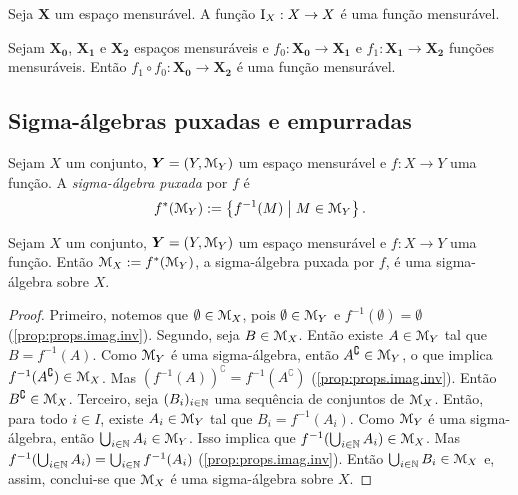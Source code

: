 \begin{proposition}
Seja $\bm X$ um espaço mensurável. A função $\mathrm{I}_X: X \to X$ é uma função mensurável.
\end{proposition}

\begin{proposition}
Sejam $\bm{X_0}$, $\bm{X_1}$ e $\bm{X_2}$ espaços mensuráveis e $f_0: \bm{X_0} \to \bm{X_1}$ e $f_1: \bm{X_1} \to \bm{X_2}$ funções mensuráveis. Então $f_1 \circ f_0: \bm{X_0} \to \bm{X_2}$ é uma função mensurável.
\end{proposition}

\subsection{Sigma-álgebras puxadas e empurradas}

\begin{definition}
Sejam $X$ um conjunto, $\bm Y = (Y,\mathcal{M}_Y)$ um espaço mensurável e $f: X \to Y$ uma função. A \emph{sigma-álgebra puxada} por $f$ é
	\begin{equation*}
	f^*(\mathcal{M}_Y) := \left\{{f^{-1}(M)}\;\middle\vert\;{M \in \mathcal{M}_Y}\right\}.
	\end{equation*}
\end{definition}

\begin{proposition}
Sejam $X$ um conjunto, $\bm Y = (Y,\mathcal{M}_Y)$ um espaço mensurável e $f: X \to Y$ uma função. Então $\mathcal{M}_X := f^*(\mathcal{M}_Y)$, a sigma-álgebra puxada por $f$, é uma sigma-álgebra sobre $X$.
\end{proposition}
\begin{proof}
Primeiro, notemos que $\emptyset \in \mathcal{M}_X$, pois $\emptyset \in \mathcal{M}_Y$ e $f^{-1}(\emptyset) = \emptyset$ (\ref{prop:props.imag.inv}). Segundo, seja $B \in \mathcal{M}_X$. Então existe $A \in \mathcal{M}_Y$ tal que $B = f^{-1}(A)$. Como $\mathcal{M}_Y$ é uma sigma-álgebra, então $A^\complement \in \mathcal{M}_Y$, o que implica $f^{-1}(A^\complement) \in \mathcal{M}_X$. Mas $(f^{-1}(A))^\complement = f^{-1}(A^\complement)$ (\ref{prop:props.imag.inv}). Então $B^\complement \in \mathcal{M}_X$. Terceiro, seja $(B_i)_{i \in \mathbb{N}}$ uma sequência de conjuntos de $\mathcal{M}_X$. Então, para todo $i \in I$, existe $A_i \in \mathcal{M}_Y$ tal que $B_i = f^{-1}(A_i)$. Como $\mathcal{M}_Y$ é uma sigma-álgebra, então $\bigcup_{i \in \mathbb{N}} A_i \in \mathcal{M}_Y$. Isso implica que $f^{-1}(\bigcup_{i \in \mathbb{N}} A_i) \in \mathcal{M}_X$. Mas $f^{-1}(\bigcup_{i \in \mathbb{N}} A_i) = \bigcup_{i \in \mathbb{N}} f^{-1}(A_i)$ (\ref{prop:props.imag.inv}). Então $\bigcup_{i \in \mathbb{N}} B_i \in \mathcal{M}_X$ e, assim, conclui-se que $\mathcal{M}_X$ é uma sigma-álgebra sobre $X$.
\end{proof}

